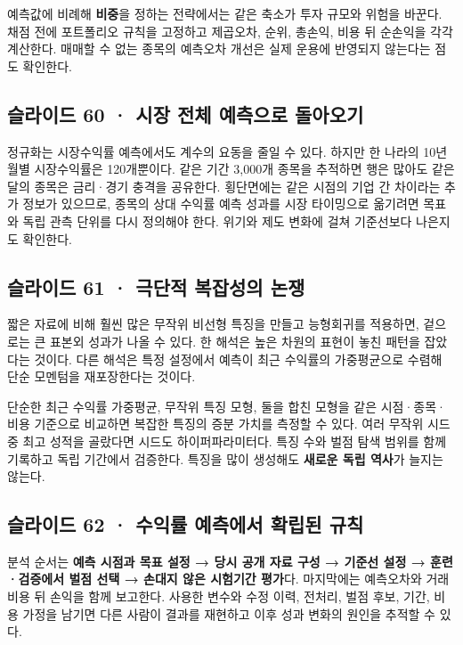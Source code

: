 \documentclass[11pt,a4paper]{article}
\begin{document}
예측값에 비례해 \textbf{비중}을 정하는 전략에서는 같은 축소가 투자 규모와 위험을 바꾼다. 채점 전에 포트폴리오 규칙을 고정하고 제곱오차, 순위, 총손익, 비용 뒤 순손익을 각각 계산한다. 매매할 수 없는 종목의 예측오차 개선은 실제 운용에 반영되지 않는다는 점도 확인한다.\par

\subsection{슬라이드 60 · 시장 전체 예측으로 돌아오기}
정규화는 시장수익률 예측에서도 계수의 요동을 줄일 수 있다. 하지만 한 나라의 10년 월별 시장수익률은 120개뿐이다. 같은 기간 3,000개 종목을 추적하면 행은 많아도 같은 달의 종목은 금리·경기 충격을 공유한다. 횡단면에는 같은 시점의 기업 간 차이라는 추가 정보가 있으므로, 종목의 상대 수익률 예측 성과를 시장 타이밍으로 옮기려면 목표와 독립 관측 단위를 다시 정의해야 한다. 위기와 제도 변화에 걸쳐 기준선보다 나은지도 확인한다.\par

\subsection{슬라이드 61 · 극단적 복잡성의 논쟁}
짧은 자료에 비해 훨씬 많은 무작위 비선형 특징을 만들고 능형회귀를 적용하면, 겉으로는 큰 표본외 성과가 나올 수 있다. 한 해석은 높은 차원의 표현이 놓친 패턴을 잡았다는 것이다. 다른 해석은 특정 설정에서 예측이 최근 수익률의 가중평균으로 수렴해 단순 모멘텀을 재포장한다는 것이다.\par

단순한 최근 수익률 가중평균, 무작위 특징 모형, 둘을 합친 모형을 같은 시점·종목·비용 기준으로 비교하면 복잡한 특징의 증분 가치를 측정할 수 있다. 여러 무작위 시드 중 최고 성적을 골랐다면 시드도 하이퍼파라미터다. 특징 수와 벌점 탐색 범위를 함께 기록하고 독립 기간에서 검증한다. 특징을 많이 생성해도 \textbf{새로운 독립 역사}가 늘지는 않는다.\par

\subsection{슬라이드 62 · 수익률 예측에서 확립된 규칙}
분석 순서는 \textbf{예측 시점과 목표 설정 → 당시 공개 자료 구성 → 기준선 설정 → 훈련·검증에서 벌점 선택 → 손대지 않은 시험기간 평가}다. 마지막에는 예측오차와 거래비용 뒤 손익을 함께 보고한다. 사용한 변수와 수정 이력, 전처리, 벌점 후보, 기간, 비용 가정을 남기면 다른 사람이 결과를 재현하고 이후 성과 변화의 원인을 추적할 수 있다.\par
\end{document}
